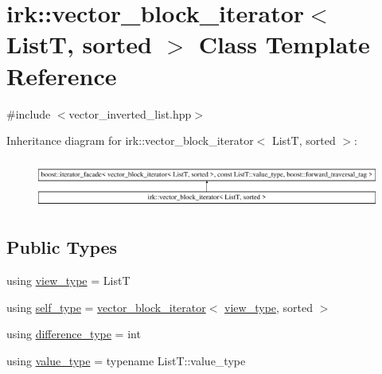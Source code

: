 \hypertarget{classirk_1_1vector__block__iterator}{}\section{irk\+:\+:vector\+\_\+block\+\_\+iterator$<$ ListT, sorted $>$ Class Template Reference}
\label{classirk_1_1vector__block__iterator}


{\ttfamily \#include $<$vector\+\_\+inverted\+\_\+list.\+hpp$>$}

Inheritance diagram for irk\+:\+:vector\+\_\+block\+\_\+iterator$<$ ListT, sorted $>$\+:\begin{figure}[H]
\begin{center}
\leavevmode
\includegraphics[height=1.627907cm]{classirk_1_1vector__block__iterator}
\end{center}
\end{figure}
\subsection*{Public Types}
\begin{DoxyCompactItemize}
\item 
using \mbox{\hyperlink{classirk_1_1vector__block__iterator_aab9b845032870211b56eddcfd9f8cadb}{view\+\_\+type}} = ListT
\item 
using \mbox{\hyperlink{classirk_1_1vector__block__iterator_a39e5fae2a4258ea1a7cad14a66be2908}{self\+\_\+type}} = \mbox{\hyperlink{classirk_1_1vector__block__iterator}{vector\+\_\+block\+\_\+iterator}}$<$ \mbox{\hyperlink{classirk_1_1vector__block__iterator_aab9b845032870211b56eddcfd9f8cadb}{view\+\_\+type}}, sorted $>$
\item 
using \mbox{\hyperlink{classirk_1_1vector__block__iterator_adc4ee937499f8c9ea24a6f99401b4d22}{difference\+\_\+type}} = int
\item 
using \mbox{\hyperlink{classirk_1_1vector__block__iterator_aaf15da7489a2eb86a95b4c309053e6de}{value\+\_\+type}} = typename List\+T\+::value\+\_\+type
\end{DoxyCompactItemize}
